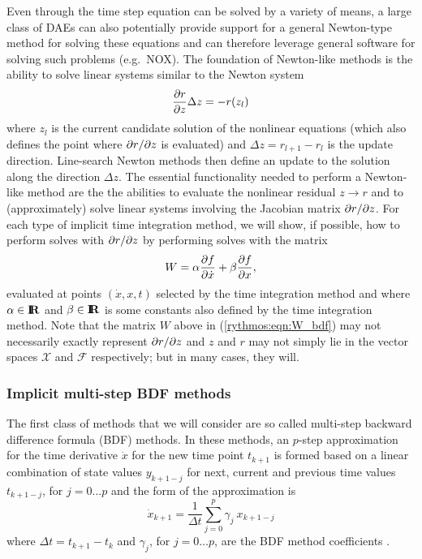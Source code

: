 \documentclass[pdf,ps2pdf,11pt]{SANDreport}
\begin{document}
Even through the time step equation can be solved by a variety of means, a
large class of DAEs can also potentially provide support for a general
Newton-type method for solving these equations and can therefore leverage
general software for solving such problems (e.g.\ NOX).  The foundation of
Newton-like methods is the ability to solve linear systems similar to the
Newton system
%
\begin{equation}
\displaystyle{\frac{\partial r}{\partial z}} \Delta z = - r(z_l)
\end{equation}
%
where $z_l$ is the current candidate solution of the nonlinear equations
(which also defines the point where $\partial r / \partial z$ is evaluated) and $\Delta z =
r_{l+1} - r_l$ is the update direction.  Line-search Newton methods then
define an update to the solution along the direction $\Delta z$.  The
essential functionality needed to perform a Newton-like method are the the
abilities to evaluate the nonlinear residual $z {}\rightarrow r$ and to
(approximately) solve linear systems involving the Jacobian matrix
$\partial r / \partial z$.  For each type of implicit time integration method, we will
show, if possible, how to perform solves with $\partial r / \partial z$ by performing
solves with the matrix
%
\begin{equation}
W = \alpha \displaystyle{\frac{\partial f}{\partial \dot{x}}} + \beta \displaystyle{\frac{\partial f}{\partial x}},
\label{rythmos:eqn:W}
\end{equation}
%
evaluated at points $(\dot{x},x,t)$ selected by the time integration method
and where $\alpha\in\mbox{\textbf{I}}\hspace{-0.6ex}\mbox{\textbf{R}}$ and $\beta\in\mbox{\textbf{I}}\hspace{-0.6ex}\mbox{\textbf{R}}$ is some constants also defined by
the time integration method.  Note that the matrix $W$ above in
(\ref{rythmos:eqn:W_bdf}) may not necessarily exactly represent $\partial r / \partial z$
and $z$ and $r$ may not simply lie in the vector spaces $\mathcal{X}$ and
$\mathcal{F}$ respectively; but in many cases, they will.

\subsubsection{Implicit multi-step BDF methods}

The first class of methods that we will consider are so called multi-step
backward difference formula (BDF) methods.  In these methods, an $p$-step
approximation for the time derivative $\dot{x}$ for the new time point
$t_{k+1}$ is formed based on a linear combination of state values $y_{k+1-j}$
for next, current and previous time values $t_{k+1-j}$, for $j = 0 {}\ldots p$
and the form of the approximation is
%
\begin{equation}
\dot{x}_{k+1} = \frac{1}{\Delta t} \sum_{j=0}^{p} \gamma_j \: x_{k+1-j}
\label{rythmos:eqn:bdf_x_dot}
\end{equation}
%
where $\Delta t = t_{k+1} - t_k$ and $\gamma_j$, for $j=0 {}\ldots p$, are the
BDF method coefficients \cite{AscherPetzold}.
\end{document}
